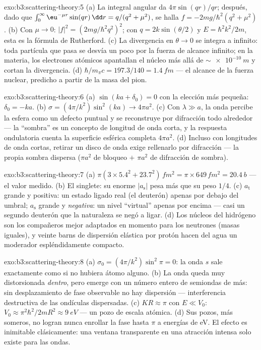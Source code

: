 \begin{solution}{exo:b3:scattering-theory:5}
(a) La integral angular da $4\pi\sin(qr)/qr$; después, dado que
$\int_0^\infty\eu^{-\mu r}\sin(qr)\,\dd r = q/(q^2 + \mu^2)$,
se halla $f = -2mg/\hbar^2(q^2 + \mu^2)$. (b) Con $\mu \to 0$: $|f|^2 =
(2mg/\hbar^2q^2)^2$; con $q = 2k\sin(\theta/2)$ y $E =
\hbar^2k^2/2m$, esta es la fórmula de Rutherford. (c) La divergencia en $\theta \to
0$ se integra a infinito: toda partícula que pasa se
desvía un poco por la fuerza de alcance infinito; en la materia, los
electrones atómicos apantallan el núcleo más allá de $\sim\qty{e-10}{m}$ y
cortan la divergencia. (d) $\hbar/m_\pi c = 197.3/140 = \qty{1.4}{fm}$
--- el alcance de la fuerza nuclear, predicho a partir de la masa del pion.
\end{solution}

\begin{solution}{exo:b3:scattering-theory:6}
(a) $\sin(ka + \delta_0) = 0$ con la elección más pequeña: $\delta_0
= -ka$. (b) $\sigma = (4\pi/k^2)\sin^2(ka) \to 4\pi a^2$. (c) Con
$\lambda \gg a$, la onda percibe la esfera como un defecto puntual y
se reconstruye por difracción todo alrededor --- la ``sombra'' es un
concepto de longitud de onda corta, y la respuesta ondulatoria cuenta la
superficie esférica completa $4\pi a^2$. (d) Incluso con longitudes de onda
cortas, retirar un disco de onda exige rellenarlo por difracción --- la
propia sombra dispersa ($\pi a^2$ de bloqueo $+$ $\pi a^2$ de
difracción de sombra).
\end{solution}

\begin{solution}{exo:b3:scattering-theory:7}
(a) $\pi(3 \times 5.4^2 + 23.7^2)\,\unit{fm^2} = \pi \times 649
\,\unit{fm^2} = \qty{20.4}{b}$ --- el valor medido. (b) El
singlete: su enorme $|a_{\text{s}}|$ pesa más que su peso $1/4$. (c)
$a_{\text{t}}$ grande y positiva: un estado ligado real (el
deuterón) apenas por debajo del umbral; $a_{\text{s}}$ grande y
\emph{negativa}: un nivel ``virtual'' apenas por encima --- casi un
segundo deuterón que la naturaleza se negó a ligar. (d) Los núcleos del
hidrógeno son los compañeros mejor adaptados en momento para los neutrones
(masas iguales), y veinte barns de dispersión elástica por protón hacen del
agua un moderador espléndidamente compacto.
\end{solution}

\begin{solution}{exo:b3:scattering-theory:8}
(a) $\sigma_0 = (4\pi/k^2)\sin^2\pi = 0$: la onda $s$ sale
exactamente como si no hubiera átomo alguno. (b) La onda queda muy
distorsionada \emph{dentro}, pero emerge con un número entero de
semiondas de más: sin desplazamiento de fase observable no hay dispersión
--- interferencia destructiva de las ondículas dispersadas. (c) $KR
\approx \pi$ con $E \ll V_0$: $V_0 \approx \pi^2\hbar^2/2mR^2
\approx \qty{9}{eV}$ --- un pozo de escala atómica. (d) Sus pozos, más
someros, no logran nunca enrollar la fase hasta $\pi$ a energías de
eV. El efecto es inimitable clásicamente: una ventana transparente en una
atracción intensa solo existe para las ondas.
\end{solution}


